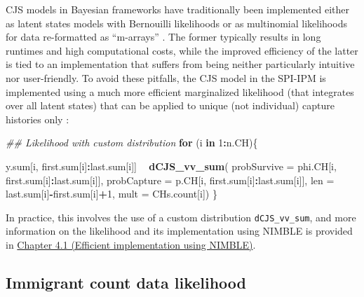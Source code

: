 \documentclass[
]{book}
\newenvironment{Shaded}{\begin{snugshade}}{\end{snugshade}}
\newcommand{\CommentTok}[1]{\textcolor[rgb]{0.56,0.35,0.01}{\textit{#1}}}
\newcommand{\ControlFlowTok}[1]{\textcolor[rgb]{0.13,0.29,0.53}{\textbf{#1}}}
\newcommand{\DataTypeTok}[1]{\textcolor[rgb]{0.13,0.29,0.53}{#1}}
\newcommand{\DecValTok}[1]{\textcolor[rgb]{0.00,0.00,0.81}{#1}}
\newcommand{\KeywordTok}[1]{\textcolor[rgb]{0.13,0.29,0.53}{\textbf{#1}}}
\newcommand{\NormalTok}[1]{#1}
\newcommand{\OperatorTok}[1]{\textcolor[rgb]{0.81,0.36,0.00}{\textbf{#1}}}
\newcommand{\StringTok}[1]{\textcolor[rgb]{0.31,0.60,0.02}{#1}}
\begin{document}
CJS models in Bayesian frameworks have traditionally been implemented either as latent states models with Bernouilli likelihoods or as multinomial likelihoods for data re-formatted as ``m-arrays'' \citep{gimenez2007, kery2011}. The former typically results in long runtimes and high computational costs, while the improved efficiency of the latter is tied to an implementation that suffers from being neither particularly intuitive nor user-friendly. To avoid these pitfalls, the CJS model in the SPI-IPM is implemented using a much more efficient marginalized likelihood (that integrates over all latent states) that can be applied to unique (not individual) capture histories only \citep[following][]{turek2016}:

\begin{Shaded}
\begin{Highlighting}[]
\CommentTok{## Likelihood with custom distribution}
\ControlFlowTok{for}\NormalTok{ (i }\ControlFlowTok{in} \DecValTok{1}\OperatorTok{:}\NormalTok{n.CH)\{}

\NormalTok{  y.sum[i, first.sum[i]}\OperatorTok{:}\NormalTok{last.sum[i]] }\OperatorTok{~}\StringTok{ }\KeywordTok{dCJS_vv_sum}\NormalTok{(}
      \DataTypeTok{probSurvive =}\NormalTok{ phi.CH[i, first.sum[i]}\OperatorTok{:}\NormalTok{last.sum[i]],}
      \DataTypeTok{probCapture =}\NormalTok{ p.CH[i, first.sum[i]}\OperatorTok{:}\NormalTok{last.sum[i]],}
      \DataTypeTok{len =}\NormalTok{ last.sum[i]}\OperatorTok{-}\NormalTok{first.sum[i]}\OperatorTok{+}\DecValTok{1}\NormalTok{,}
      \DataTypeTok{mult =}\NormalTok{ CHs.count[i])}
\NormalTok{\}}
\end{Highlighting}
\end{Shaded}

In practice, this involves the use of a custom distribution \texttt{dCJS\_vv\_sum}, and more information on the likelihood and its implementation using NIMBLE is provided in \protect\hyperlink{ux5cux23ux5cux2520Efficientux5cux2520implementationux5cux2520usingux5cux2520NIMBLE}{Chapter 4.1 (Efficient implementation using NIMBLE)}.

\hypertarget{immigrant-count-data-likelihood}{%
\subsection{Immigrant count data likelihood}\label{immigrant-count-data-likelihood}}
\end{document}
